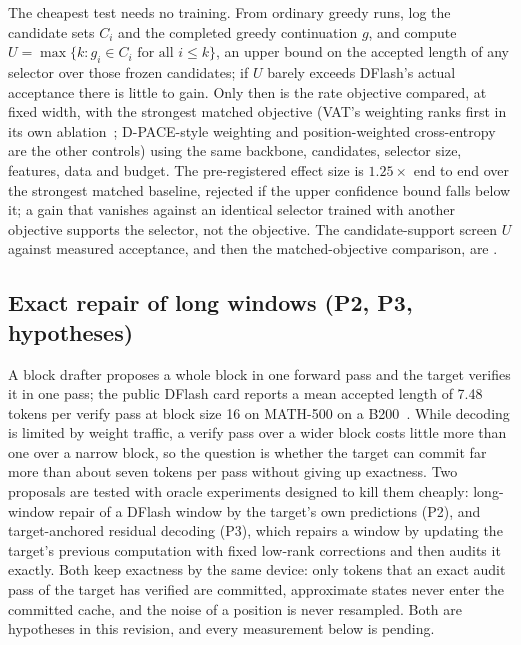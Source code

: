 The cheapest test needs no training. From ordinary greedy runs, log the candidate sets $C_i$ and the completed greedy continuation $g$, and compute $U=\max\{k:g_i\in C_i\text{ for all }i\le k\}$, an upper bound on the accepted length of any selector over those frozen candidates; if $U$ barely exceeds DFlash's actual acceptance there is little to gain. Only then is the rate objective compared, at fixed width, with the strongest matched objective (VAT's weighting ranks first in its own ablation~\cite{vat}; D-PACE-style weighting and position-weighted cross-entropy are the other controls) using the same backbone, candidates, selector size, features, data and budget.
The pre-registered effect size is $1.25\times$ end to end over the strongest matched baseline, rejected if the upper confidence bound falls below it; a gain that vanishes against an identical selector trained with another objective supports the selector, not the objective. The candidate-support screen $U$ against measured acceptance, and then the matched-objective comparison, are .

\subsection{Exact repair of long windows (P2, P3, hypotheses)}\label{sec:repair}
A block drafter proposes a whole block in one forward pass and the target verifies it in one pass; the public DFlash card reports a mean accepted length of 7.48 tokens per verify pass at block size 16 on MATH-500 on a B200~\cite{dflash4bcard}. While decoding is limited by weight traffic, a verify pass over a wider block costs little more than one over a narrow block, so the question is whether the target can commit far more than about seven tokens per pass without giving up exactness. Two proposals are tested with oracle experiments designed to kill them cheaply: long-window repair of a DFlash window by the target's own predictions (P2), and target-anchored residual decoding (P3), which repairs a window by updating the target's previous computation with fixed low-rank corrections and then audits it exactly. Both keep exactness by the same device: only tokens that an exact audit pass of the target has verified are committed, approximate states never enter the committed cache, and the noise of a position is never resampled. Both are hypotheses in this revision, and every measurement below is pending.

